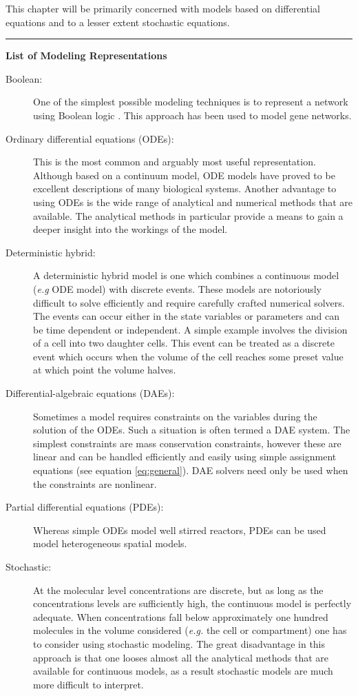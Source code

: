 This chapter will be primarily concerned with models based on
differential equations and to a lesser extent stochastic equations.

\begin{center}\rule{3in}{0.4pt}\end{center}

\textbf{List of Modeling Representations}

\begin{description}
\item[Boolean:]
One of the simplest possible modeling techniques is to represent a
network using Boolean logic \autocite{DeJong2002}. This approach has
been used to model gene networks.

\item[Ordinary differential equations (ODEs):]
This is the most common and arguably most useful representation.
Although based on a continuum model, ODE models have proved to be
excellent descriptions of many biological systems. Another advantage to
using ODEs is the wide range of analytical and numerical methods that
are available. The analytical methods in particular provide a means to
gain a deeper insight into the workings of the model.

\item[Deterministic hybrid:]
A deterministic hybrid model is one which combines a continuous model
(\emph{e.g} ODE model) with discrete events. These models are
notoriously difficult to solve efficiently and require carefully crafted
numerical solvers. The events can occur either in the state variables or
parameters and can be time dependent or independent. A simple example
involves the division of a cell into two daughter cells. This event can
be treated as a discrete event which occurs when the volume of the cell
reaches some preset value at which point the volume halves.

\item[Differential-algebraic equations (DAEs):]
Sometimes a model requires constraints on the variables during the
solution of the ODEs. Such a situation is often termed a DAE system. The
simplest constraints are mass conservation constraints, however these
are linear and can be handled efficiently and easily using simple
assignment equations (see equation \ref{eq:general}). DAE solvers need
only be used when the constraints are nonlinear.

\item[Partial differential equations (PDEs):]
Whereas simple ODEs model well stirred reactors, PDEs can be used model
heterogeneous spatial models.

\item[Stochastic:]
At the molecular level concentrations are discrete, but as long as the
concentrations levels are sufficiently high, the continuous model is
perfectly adequate. When concentrations fall below approximately one
hundred molecules in the volume considered (\emph{e.g.} the cell or
compartment) one has to consider using stochastic modeling. The great
disadvantage in this approach is that one looses almost all the
analytical methods that are available for continuous models, as a result
stochastic models are much more difficult to interpret.

\end{description}
